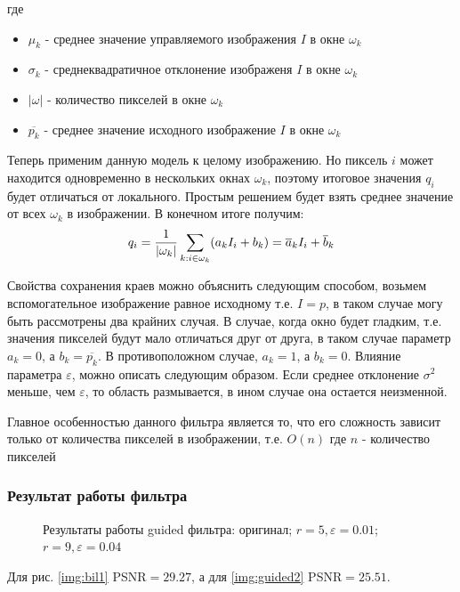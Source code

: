 где
\begin{itemize}
	\item $\mu_k$ - среднее значение управляемого изображения $I$ в окне $\omega_k$
	\item $\sigma_k$ - среднеквадратичное отклонение изображеня $I$ в окне $\omega_k$
	\item $|\omega|$ - количество пикселей в окне $\omega_k$ 
	\item $\overline{p_k}$ - среднее значение исходного изображение $I$ в окне $\omega_k$
\end{itemize}
Теперь применим данную модель к целому изображению. Но пиксель $i$ может находится одновременно в нескольких окнах $\omega_k$, поэтому итоговое значения $q_i$ будет отличаться от локального. Простым решением будет взять среднее значение от всех $\omega_k$ в изображении. В конечном итоге получим:
\begin{equation}
	q_i=\frac{1}{|\omega_k|}\sum_{k:i\in \omega_k}(a_kI_i+b_k)\\
	= \overline{a}_kI_i+\overline{b}_k
\end{equation}


Свойства сохранения краев можно объяснить следующим способом, возьмем вспомогательное изображение равное исходному т.е. $I=p$, в таком случае могу быть рассмотрены два крайних случая.
В случае, когда  окно будет гладким, т.е. значения пикселей будут мало отличаться друг от друга, в таком случае параметр $a_k=0$, а $b_k=\overline{p_k}$. 
В противоположном случае, $a_k=1$, а $b_k=0$.
Влияние параметра $\varepsilon$, можно описать следующим образом. Если среднее отклонение $\sigma^2$ меньше, чем $\varepsilon$, то область размывается, в ином случае она остается неизменной.

Главное особенностью данного фильтра является то, что его сложность зависит только от количества пикселей в изображении, т.е. $O(n)$ где $n$ - количество пикселей
\subsubsection{Результат работы фильтра}
\begin{figure}[H]
	\centering
	\hspace{0.0125ex}
	\hspace{0.0125ex}
	\caption{Результаты работы guided фильтра:  оригинал;   $r=5,\varepsilon=0.01$; $r=9,\varepsilon=0.04$}
	\label{img:guidRes}
\end{figure}
Для рис. \ref{img:bil1} PSNR$=29.27$, а для \ref{img:guided2} PSNR$=25.51$.


